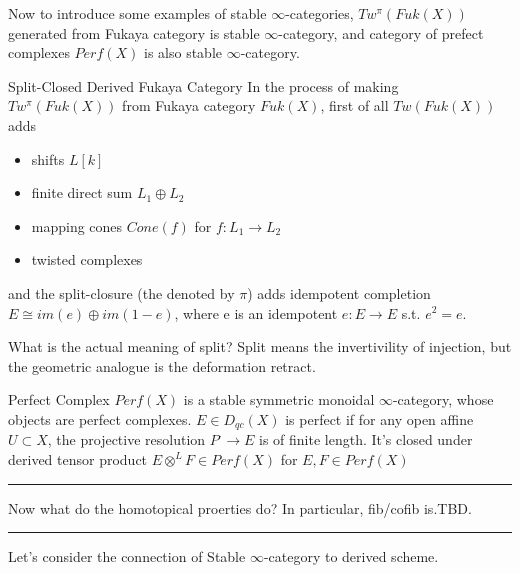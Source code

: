 \documentclass{article}
\begin{document}
\noindent
Now to introduce some examples of stable $\infty$-categories, $Tw^\pi(Fuk(X))$ generated from Fukaya category is stable $\infty$-category,
and category of prefect complexes $Perf(X)$ is also stable $\infty$-category.


\begin{example}{Split-Closed Derived Fukaya Category}{}
In the process of making $Tw^\pi(Fuk(X))$ from Fukaya category $Fuk(X)$, 
first of all $Tw(Fuk(X))$ adds \\

\begin{itemize}
\item shifts $L[k]$
\item finite direct sum $L_1\oplus L_2$
\item mapping cones $Cone(f)$ for $f:L_1\to L_2$
\item twisted complexes
\end{itemize}

and the split-closure (the denoted by $\pi$) adds idempotent completion $E \cong im(e) \oplus im(1-e)$,
where e is an idempotent $e:E\to E$ s.t. $e^2 = e$.
\end{example}


\noindent
What is the actual meaning of split? Split means the invertivility of injection, but the geometric analogue is the deformation retract.


\begin{example}{Perfect Complex}{}
$Perf(X)$ is a stable symmetric monoidal $\infty$-category, whose objects are perfect complexes.
$E\in D_{qc}(X)$ is perfect if for any open affine $U\subset X$, the projective resolution $P^\cdot \to E$ is of finite length.
It's closed under derived tensor product $E\otimes^L F\in Perf(X)$ for $E,F\in Perf(X)$
\end{example}


\vspace{0.5cm}
\noindent\rule{\textwidth}{0.4pt}
\vspace{0.5cm}


\noindent 
Now what do the homotopical proerties do? In particular, fib/cofib is.TBD. \\



\vspace{0.5cm}
\noindent\rule{\textwidth}{0.4pt}
\vspace{0.5cm}


\noindent
Let's consider the connection of Stable $\infty$-category to derived scheme.
\end{document}
